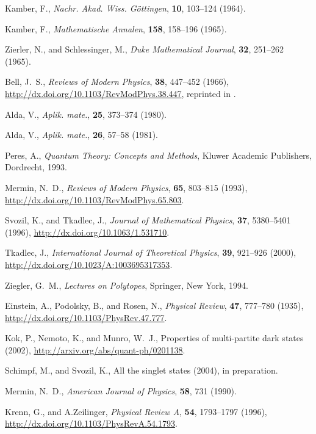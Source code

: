 \documentclass{aipproc}
\begin{document}
\begin{thebibliography}{10}
Kamber, F., \emph{Nachr. Akad. Wiss. G{\"{o}}ttingen}, \textbf{10}, 103--124
  (1964).

Kamber, F., \emph{Mathematische Annalen}, \textbf{158}, 158--196 (1965).

Zierler, N., and Schlessinger, M., \emph{Duke Mathematical Journal},
  \textbf{32}, 251--262 (1965).

Bell, J.~S., \emph{Reviews of Modern Physics}, \textbf{38}, 447--452 (1966),
  \urlprefix\url{http://dx.doi.org/10.1103/RevModPhys.38.447}, reprinted in
  \cite[pp. 1-13]{bell-87}.

Alda, V., \emph{Aplik. mate.}, \textbf{25}, 373--374 (1980).

Alda, V., \emph{Aplik. mate.}, \textbf{26}, 57--58 (1981).

Peres, A., \emph{Quantum Theory: Concepts and Methods}, Kluwer Academic
  Publishers, Dordrecht, 1993.

Mermin, N.~D., \emph{Reviews of Modern Physics}, \textbf{65}, 803--815 (1993),
  \urlprefix\url{http://dx.doi.org/10.1103/RevModPhys.65.803}.

Svozil, K., and Tkadlec, J., \emph{Journal of Mathematical Physics},
  \textbf{37}, 5380--5401 (1996),
  \urlprefix\url{http://dx.doi.org/10.1063/1.531710}.

Tkadlec, J., \emph{International Journal of Theoretical Physics}, \textbf{39},
  921--926 (2000), \urlprefix\url{http://dx.doi.org/10.1023/A:1003695317353}.

Ziegler, G.~M., \emph{Lectures on Polytopes}, Springer, New York, 1994.

Einstein, A., Podolsky, B., and Rosen, N., \emph{Physical Review}, \textbf{47},
  777--780 (1935), \urlprefix\url{http://dx.doi.org/10.1103/PhysRev.47.777}.

Kok, P., Nemoto, K., and Munro, W.~J., Properties of multi-partite dark states
  (2002), \urlprefix\url{http://arxiv.org/abs/quant-ph/0201138}.

Schimpf, M., and Svozil, K., All the singlet states (2004), in preparation.

Mermin, N.~D., \emph{American Journal of Physics}, \textbf{58}, 731 (1990).

Krenn, G., and A.Zeilinger, \emph{Physical Review A}, \textbf{54}, 1793--1797
  (1996), \urlprefix\url{http://dx.doi.org/10.1103/PhysRevA.54.1793}.


\end{thebibliography}
\end{document}
